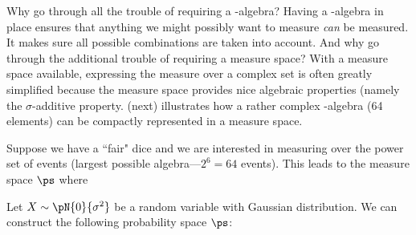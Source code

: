 Why go through all the trouble of requiring a \txsigma-algebra?
Having a \txsigma-algebra in place ensures that anything we might possibly
want to measure {\em can} be measured.
It makes sure all possible combinations are taken into account.
And why go through the additional trouble of requiring a measure space?
With a measure space available, expressing the measure over a complex
set is often greatly simplified because the measure space provides nice
algebraic properties (namely the $\sigma$-additive property.
 (next) illustrates how a rather complex
\txsigma-algebra (64 elements) can be compactly represented in a measure space.
\begin{example}
\label{ex:prob_123456}
Suppose we have a ``fair" dice and we are interested in measuring over the
power set of events (largest possible algebra---$2^6=64$ events).
This leads to the measure space $\ps$ where
\end{example}

\begin{example}
Let $X\sim\pN{0}{\sigma^2}$ be a random variable with Gaussian distribution.
We can construct the following probability space $\ps$:

\end{example}

